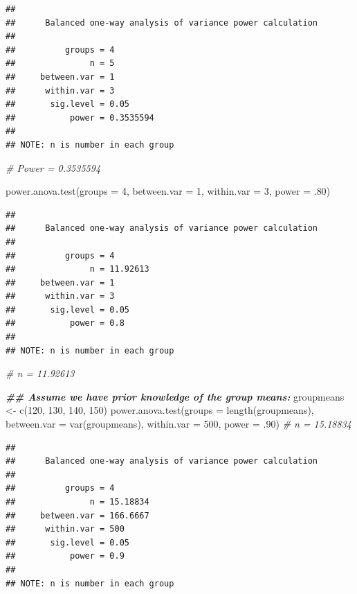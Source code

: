 \documentclass[
]{book}
\newenvironment{Shaded}{\begin{snugshade}}{\end{snugshade}}
\newcommand{\AttributeTok}[1]{\textcolor[rgb]{0.77,0.63,0.00}{#1}}
\newcommand{\CommentTok}[1]{\textcolor[rgb]{0.56,0.35,0.01}{\textit{#1}}}
\newcommand{\DecValTok}[1]{\textcolor[rgb]{0.00,0.00,0.81}{#1}}
\newcommand{\DocumentationTok}[1]{\textcolor[rgb]{0.56,0.35,0.01}{\textbf{\textit{#1}}}}
\newcommand{\FunctionTok}[1]{\textcolor[rgb]{0.00,0.00,0.00}{#1}}
\newcommand{\NormalTok}[1]{#1}
\newcommand{\OtherTok}[1]{\textcolor[rgb]{0.56,0.35,0.01}{#1}}
\begin{document}
\begin{verbatim}
## 
##      Balanced one-way analysis of variance power calculation 
## 
##          groups = 4
##               n = 5
##     between.var = 1
##      within.var = 3
##       sig.level = 0.05
##           power = 0.3535594
## 
## NOTE: n is number in each group
\end{verbatim}

\begin{Shaded}
\begin{Highlighting}[]
\CommentTok{\# Power = 0.3535594}

\FunctionTok{power.anova.test}\NormalTok{(}\AttributeTok{groups =} \DecValTok{4}\NormalTok{, }\AttributeTok{between.var =} \DecValTok{1}\NormalTok{, }\AttributeTok{within.var =} \DecValTok{3}\NormalTok{,}
                 \AttributeTok{power =}\NormalTok{ .}\DecValTok{80}\NormalTok{)}
\end{Highlighting}
\end{Shaded}

\begin{verbatim}
## 
##      Balanced one-way analysis of variance power calculation 
## 
##          groups = 4
##               n = 11.92613
##     between.var = 1
##      within.var = 3
##       sig.level = 0.05
##           power = 0.8
## 
## NOTE: n is number in each group
\end{verbatim}

\begin{Shaded}
\begin{Highlighting}[]
\CommentTok{\# n = 11.92613}

\DocumentationTok{\#\# Assume we have prior knowledge of the group means:}
\NormalTok{groupmeans }\OtherTok{\textless{}{-}} \FunctionTok{c}\NormalTok{(}\DecValTok{120}\NormalTok{, }\DecValTok{130}\NormalTok{, }\DecValTok{140}\NormalTok{, }\DecValTok{150}\NormalTok{)}
\FunctionTok{power.anova.test}\NormalTok{(}\AttributeTok{groups =} \FunctionTok{length}\NormalTok{(groupmeans),}
                 \AttributeTok{between.var =} \FunctionTok{var}\NormalTok{(groupmeans),}
                 \AttributeTok{within.var =} \DecValTok{500}\NormalTok{, }\AttributeTok{power =}\NormalTok{ .}\DecValTok{90}\NormalTok{) }\CommentTok{\# n = 15.18834}
\end{Highlighting}
\end{Shaded}

\begin{verbatim}
## 
##      Balanced one-way analysis of variance power calculation 
## 
##          groups = 4
##               n = 15.18834
##     between.var = 166.6667
##      within.var = 500
##       sig.level = 0.05
##           power = 0.9
## 
## NOTE: n is number in each group
\end{verbatim}
\end{document}
